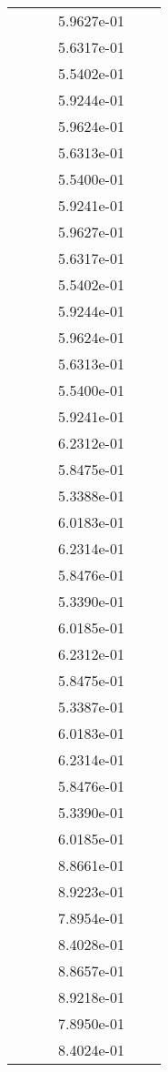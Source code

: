 \begin{xltabular}{\textwidth}{r|rS[table-format=1.3e+2]S[table-format=1.4e+2]S[table-format=1.4e+2]S[table-format=-1.5]}
&  &  & 5.9627e-01 & & \\
&  &  & 5.6317e-01 & & \\
&  &  & 5.5402e-01 & & \\
&  &  & 5.9244e-01 & & \\
&  &  & 5.9624e-01 & & \\
&  &  & 5.6313e-01 & & \\
&  &  & 5.5400e-01 & & \\
&  &  & 5.9241e-01 & & \\
&  &  & 5.9627e-01 & & \\
&  &  & 5.6317e-01 & & \\
&  &  & 5.5402e-01 & & \\
&  &  & 5.9244e-01 & & \\
&  &  & 5.9624e-01 & & \\
&  &  & 5.6313e-01 & & \\
&  &  & 5.5400e-01 & & \\
&  &  & 5.9241e-01 & & \\
&  &  & 6.2312e-01 & & \\
&  &  & 5.8475e-01 & & \\
&  &  & 5.3388e-01 & & \\
&  &  & 6.0183e-01 & & \\
&  &  & 6.2314e-01 & & \\
&  &  & 5.8476e-01 & & \\
&  &  & 5.3390e-01 & & \\
&  &  & 6.0185e-01 & & \\
&  &  & 6.2312e-01 & & \\
&  &  & 5.8475e-01 & & \\
&  &  & 5.3387e-01 & & \\
&  &  & 6.0183e-01 & & \\
&  &  & 6.2314e-01 & & \\
&  &  & 5.8476e-01 & & \\
&  &  & 5.3390e-01 & & \\
&  &  & 6.0185e-01 & & \\
&  &  & 8.8661e-01 & & \\
&  &  & 8.9223e-01 & & \\
&  &  & 7.8954e-01 & & \\
&  &  & 8.4028e-01 & & \\
&  &  & 8.8657e-01 & & \\
&  &  & 8.9218e-01 & & \\
&  &  & 7.8950e-01 & & \\
&  &  & 8.4024e-01 & & \\

\end{xltabular}

